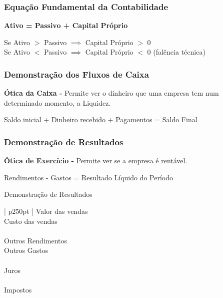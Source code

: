 \documentclass[11pt]{article}
\begin{document}
\newpage

\subsubsection*{Equação Fundamental da Contabilidade}

\begin{center}
    \textbf{Ativo = Passivo + Capital Próprio}
\end{center}

Se Ativo $>$ Passivo $\implies $ Capital Próprio $>$ 0 \\
Se Ativo $<$ Passivo $\implies $ Capital Próprio $<$ 0 (falência técnica)


\subsubsection{Demonstração dos Fluxos de Caixa}

\textbf{Ótica da Caixa -} Permite ver o dinheiro que uma empresa tem num determinado momento, a Liquidez.

\begin{center}
    Saldo inicial + Dinheiro recebido + Pagamentos = Saldo Final
\end{center}

\subsubsection{Demonstração de Resultados}

\textbf{Ótica de Exercício -} Permite ver se a empresa é rentável.

\begin{center}
    Rendimentos - Gastos = Resultado Líquido do Período
\end{center}

\begin{center}
    Demonstração de Resultados \\
    \begin{tabular}[t]{ | p{250pt} | }
        \hline Valor das vendas \\
        \hline Custo das vendas \\
        \hline {} \\
        \hline Outros Rendimentos \\
        \hline Outros Gastos \\
        \hline {} \\
        \hline Juros \\
        \hline {} \\
        \hline Impostos \\
        \hline {} \\
        \hline
    \end{tabular}
\end{center}
\end{document}
